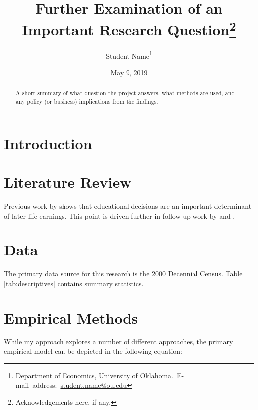 \documentclass[12pt,english]{article}
\begin{document}
\begin{singlespace}
\title{Further Examination of an Important Research Question\thanks{Acknowledgements here, if any.}}
\end{singlespace}

\author{Student Name\thanks{Department of Economics, University of Oklahoma.\
E-mail~address:~\href{mailto:student.name@ou.edu}{student.name@ou.edu}}}

\date{May 9, 2019}

\maketitle

\begin{abstract}
\begin{singlespace}
A short summary of what question the project answers, what methods are used, and any policy (or business) implications from the findings.
\end{singlespace}

\end{abstract}
\vfill{}


\pagebreak{}


\section{Introduction}\label{sec:intro}
\lipsum[3-5]

\section{Literature Review}\label{sec:litreview}
Previous work by \citet{altonji1993} shows that educational decisions are an important determinant of later-life earnings. This point is driven further in follow-up work by \citet{altonji_al2012} and \citet{altonji_al2016}.

\lipsum[3-5]

\section{Data}\label{sec:data}
The primary data source for this research is the 2000 Decennial Census. Table \ref{tab:descriptives} contains summary statistics.

\lipsum[2-5]


\section{Empirical Methods}\label{sec:methods}
While my approach explores a number of different approaches, the primary empirical model can be depicted in the following equation:
\end{document}
